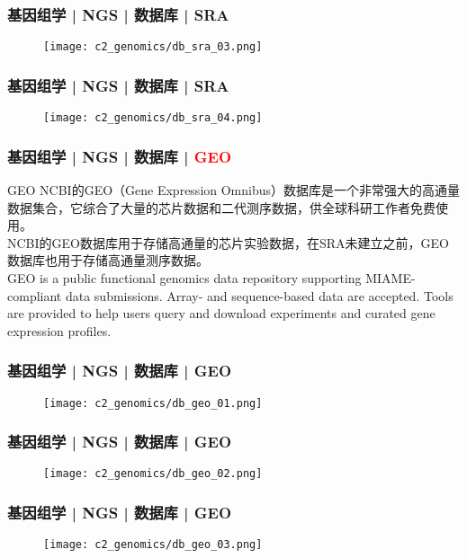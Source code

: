 \begin{frame}
  \frametitle{基因组学 | NGS | 数据库 | SRA}
  \begin{figure}
    \centering
    \texttt{[image: c2\_genomics/db\_sra\_03.png]}
  \end{figure}
\end{frame}
    
\begin{frame}
  \frametitle{基因组学 | NGS | 数据库 | SRA}
  \begin{figure}
    \centering
    \texttt{[image: c2\_genomics/db\_sra\_04.png]}
  \end{figure}
\end{frame}
    
\begin{frame}
  \frametitle{基因组学 | NGS | 数据库 | \textcolor{red}{GEO}}
  \begin{block}{GEO}
NCBI的GEO（Gene Expression Omnibus）数据库是一个非常强大的高通量数据集合，它综合了大量的芯片数据和二代测序数据，供全球科研工作者免费使用。\\
\vspace{1em}
NCBI的GEO数据库用于存储高通量的芯片实验数据，在SRA未建立之前，GEO数据库也用于存储高通量测序数据。\\
\vspace{1em}
GEO is a public functional genomics data repository supporting MIAME-compliant data submissions. Array- and sequence-based data are accepted. Tools are provided to help users query and download experiments and curated gene expression profiles.
  \end{block}
\end{frame}
    
\begin{frame}
  \frametitle{基因组学 | NGS | 数据库 | GEO}
  \begin{figure}
    \centering
    \texttt{[image: c2\_genomics/db\_geo\_01.png]}
  \end{figure}
\end{frame}
    
\begin{frame}
  \frametitle{基因组学 | NGS | 数据库 | GEO}
  \begin{figure}
    \centering
    \texttt{[image: c2\_genomics/db\_geo\_02.png]}
  \end{figure}
\end{frame}

\begin{frame}
  \frametitle{基因组学 | NGS | 数据库 | GEO}
  \begin{figure}
    \centering
    \texttt{[image: c2\_genomics/db\_geo\_03.png]}
  \end{figure}
\end{frame}
    
